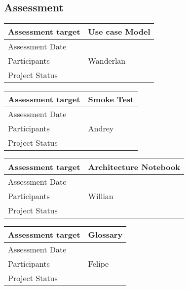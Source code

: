 \subsection*{Assessment}
%


\noindent\begin{tabular}{|l|l|}
\hline
Assessment target & Use case Model\\\hline
Assessment Date & \\\hline
Participants & Wanderlan \\\hline
Project Status & \\\hline
\end{tabular}

\noindent\begin{tabular}{|l|l|}
\hline
Assessment target & Smoke Test\\\hline
Assessment Date & \\\hline
Participants & Andrey \\\hline
Project Status & \\\hline
\end{tabular}

\noindent\begin{tabular}{|l|l|}
\hline
Assessment target & Architecture Notebook\\\hline
Assessment Date & \\\hline
Participants & Willian \\\hline
Project Status & \\\hline
\end{tabular}

\noindent\begin{tabular}{|l|l|}
\hline
Assessment target & Glossary\\\hline
Assessment Date & \\\hline
Participants & Felipe \\\hline
Project Status & \\\hline
\end{tabular}

